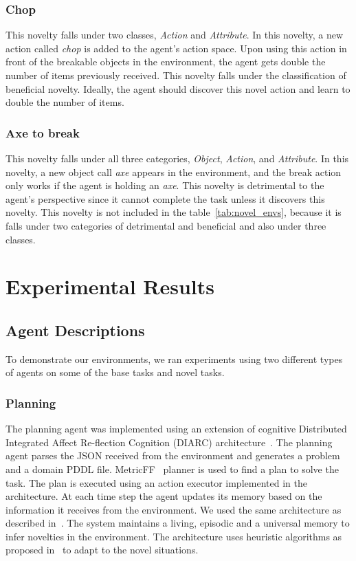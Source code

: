 \documentclass[sigconf]{aamas}
\begin{document}
\subsubsection{Chop}

This novelty falls under two classes, \emph{Action} and \emph{Attribute}. In this novelty, a new action called \emph{chop} is added to the agent's action space. Upon using this action in front of the breakable objects in the environment, the agent gets double the number of items previously received. This novelty falls under the classification of beneficial novelty. Ideally, the agent should discover this novel action and learn to double the number of items.

\subsubsection{Axe to break}

This novelty falls under all three categories, \emph{Object}, \emph{Action}, and \emph{Attribute}. In this novelty, a new object call \emph{axe} appears in the environment, and the break action only works if the agent is holding an \emph{axe}. This novelty is detrimental to the agent's perspective since it cannot complete the task unless it discovers this novelty. This novelty is not included in the table~\ref{tab:novel_envs}, because it is falls under two categories of detrimental and beneficial and also under three classes.

\section{Experimental Results}
\label{sec:experiment}

\subsection{Agent Descriptions}
To demonstrate our environments, we ran experiments using two different types of agents on some of the base tasks and novel tasks.



\subsubsection{Planning }
\label{sec:planning_agent}
The planning agent was implemented using an extension of cognitive Distributed Integrated Affect Re-flection Cognition (DIARC) architecture~\citep{schermerhorn2006diarc, scheutz2019overview}. The planning agent parses the JSON received from the environment and generates a problem and a domain PDDL file. MetricFF~\citep{hoffmann:nebel:jair-01} planner is used to find a plan to solve the task. The plan is executed using an action executor implemented in the architecture. At each time step the agent updates its memory based on the information it receives from the environment. We used the same architecture as described in~\citep{muhammad2021novelty}. The system maintains a living, episodic and a universal memory to infer novelties in the environment. The architecture uses heuristic algorithms as proposed in~\citep{sarathy2018macgyver} to adapt to the novel situations. 
\end{document}
